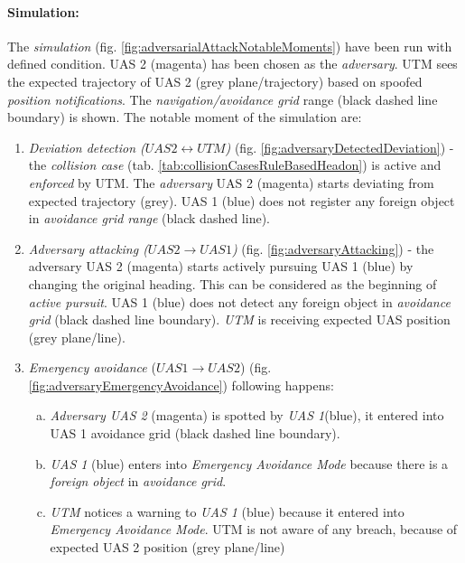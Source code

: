 \paragraph{Simulation:} The \emph{simulation} (fig. \ref{fig:adversarialAttackNotableMoments}) have been run with defined condition. UAS 2 (magenta) has been chosen as the \emph{adversary}. UTM sees the expected trajectory of UAS 2 (grey plane/trajectory) based on spoofed \emph{position notifications}. The \emph{navigation/avoidance grid} range (black dashed line boundary) is shown. The notable moment of the simulation are: 

\begin{enumerate}
    \item \emph{Deviation detection ($UAS2\leftrightarrow UTM$)} (fig. \ref{fig:adversaryDetectedDeviation}) - the \emph{collision case} (tab. \ref{tab:collisionCasesRuleBasedHeadon}) is active and \emph{enforced} by UTM. The \emph{adversary} UAS 2 (magenta) starts deviating from expected trajectory (grey). UAS 1 (blue) does not register any foreign object in \emph{avoidance grid range} (black dashed line). 
    
    \item \emph{Adversary attacking ($UAS 2 \to UAS 1$)} (fig. \ref{fig:adversaryAttacking}) - the adversary UAS 2 (magenta) starts actively pursuing UAS 1 (blue) by changing the original heading. This can be considered as the beginning of \emph{active pursuit}. UAS 1 (blue) does not detect any foreign object in \emph{avoidance grid} (black dashed line boundary). \emph{UTM} is receiving expected UAS position (grey plane/line).
    
    \item \emph{Emergency avoidance} ($UAS 1 \to UAS 2$) (fig. \ref{fig:adversaryEmergencyAvoidance}) following happens:
    \begin{enumerate}[a.]
        \item \emph{Adversary UAS 2} (magenta) is spotted by \emph{UAS 1}(blue), it entered into UAS 1 avoidance grid (black dashed line boundary).
        
        \item \emph{UAS 1} (blue) enters into \emph{Emergency Avoidance Mode} because there is a \emph{foreign object} in \emph{avoidance grid}.
        
        \item \emph{UTM} notices a warning to \emph{UAS 1} (blue) because it entered into \emph{Emergency Avoidance Mode}. UTM is not aware of any breach, because of expected UAS 2 position (grey plane/line)
        

\end{enumerate}
\end{enumerate}
